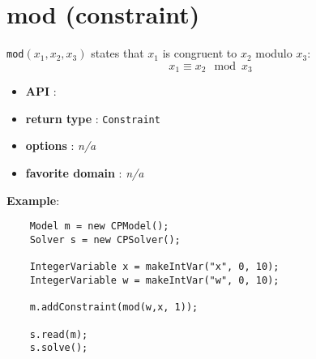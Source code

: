 \label{mod}
\hypertarget{mod}{}

\section{mod (constraint)}\label{mod:modconstraint}\hypertarget{mod:modconstraint}{}
\begin{notedef}
  \texttt{mod}$(x_1,x_2,x_3)$ states that $x_1$ is congruent to $x_2$
  modulo $x_3$:
$$x_1 \equiv x_2 \mod x_3$$
\end{notedef}
\begin{itemize}
	\item \textbf{API} : 
	\item \textbf{return type} : \texttt{Constraint}
	\item \textbf{options} : \emph{n/a}
	\item \textbf{favorite domain} : \emph{n/a}
\end{itemize}

\textbf{Example}:
\begin{lstlisting}
	Model m = new CPModel();
	Solver s = new CPSolver();
	
	IntegerVariable x = makeIntVar("x", 0, 10);
	IntegerVariable w = makeIntVar("w", 0, 10);
	
	m.addConstraint(mod(w,x, 1));
	
	s.read(m);
	s.solve();
\end{lstlisting}
